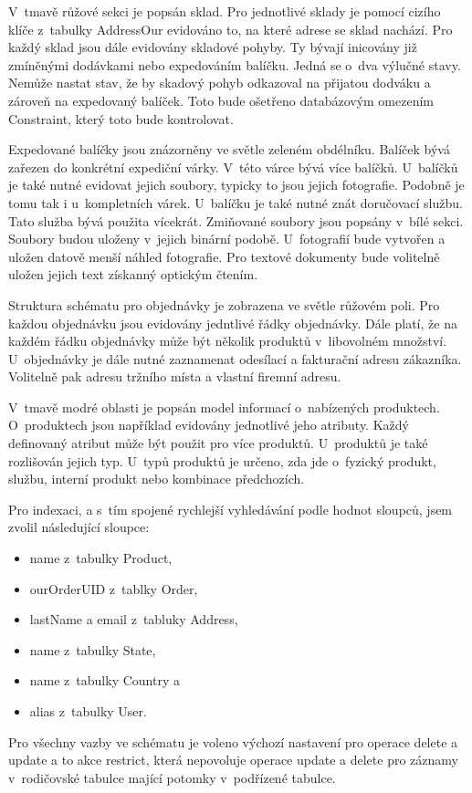 \documentclass[thesis=B,czech]{FITthesis}[2012/06/26]
\begin{document}
	V~tmavě růžové sekci je popsán sklad. Pro jednotlivé sklady je pomocí cizího klíče z~tabulky AddressOur evidováno to, na které adrese se sklad nachází. Pro každý sklad jsou dále evidovány skladové pohyby. Ty bývají inicovány již zmíněnými dodávkami nebo expedováním balíčku. Jedná se o~dva výlučné stavy. Nemůže nastat stav, že by skadový pohyb odkazoval na přijatou dodváku a zároveň na expedovaný balíček. Toto bude ošetřeno databázovým omezením Constraint, který toto bude kontrolovat.
	
	Expedované balíčky jsou znázorněny ve světle zeleném obdélníku. Balíček bývá zařezen do konkrétní expediční várky. V~této várce bývá více balíčků. U~balíčků je také nutné evidovat jejich soubory, typicky to jsou jejich fotografie. Podobně je tomu tak i u~kompletních várek. U~balíčku je také nutné znát doručovací službu. Tato služba bývá použita vícekrát. Zmiňované soubory jsou popsány v~bílé sekci. Soubory budou uloženy v~jejich binární podobě. U~fotografií bude vytvořen a uložen datově menší náhled fotografie. Pro textové dokumenty bude volitelně uložen jejich text získanný optickým čtením.

	Struktura schématu pro objednávky je zobrazena ve světle růžovém poli. Pro každou objednávku jsou evidovány jedntlivé řádky objednávky. Dále platí, že na každém řádku objednávky může být několik produktů v~libovolném množství. U~objednávky je dále nutné zaznamenat odesílací a fakturační adresu zákazníka. Volitelně pak adresu tržního místa a vlastní firemní adresu.
	
	V~tmavě modré oblasti je popsán model informací o~nabízených produktech. O~produktech jsou například evidovány jednotlivé jeho atributy. Každý definovaný atribut může být použit pro více produktů. U~produktů je také rozlišován jejich typ. U~typů produktů je určeno, zda jde o~fyzický produkt, službu, interní produkt nebo kombinace předchozích.
	
	Pro indexaci, a s~tím spojené rychlejší vyhledávání podle hodnot sloupců, jsem zvolil následující sloupce: 
	\begin{itemize}
		\item name z~tabulky Product,
		\item ourOrderUID z~tablky Order,
		\item lastName a email z~tabluky Address,
		\item name z~tabulky State,
		\item name z~tabulky Country a
		\item alias z~tabulky User.
	\end{itemize}
	Pro všechny vazby ve schématu je voleno výchozí nastavení pro operace delete a update a to akce restrict, která nepovoluje operace update a delete pro záznamy v~rodičovské tabulce mající potomky v~podřízené tabulce.
	
\end{document}
